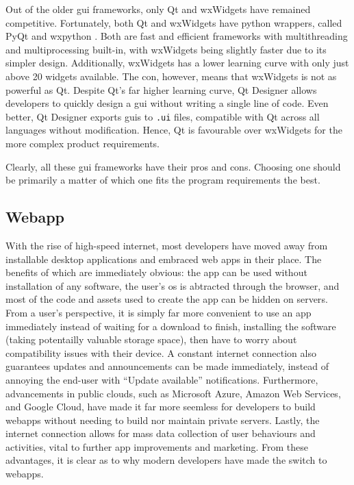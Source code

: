 \documentclass[11pt]{article}
\begin{document}
Out of the older \acrshort{gui} \glspl{framework}, only Qt and wxWidgets have remained competitive. Fortunately, both Qt and wxWidgets have \Gls{python} wrappers, called PyQt and wx\Gls{python} \cite{pyqt} \cite{wxpython}. Both are fast and efficient \glspl{framework} with multithreading and multiprocessing built-in, with wxWidgets being slightly faster due to its simpler design. Additionally, wxWidgets has a lower learning curve with only just above 20 widgets available. The con, however, means that wxWidgets is not as powerful as Qt. Despite Qt's far higher learning curve, Qt Designer allows developers to quickly design a \acrshort{gui} without writing a single line of code. Even better, Qt Designer exports \acrshort{gui}s to \texttt{.ui} files, compatible with Qt across all languages without modification. Hence, Qt is favourable over wxWidgets for the more complex product requirements.

Clearly, all these \acrshort{gui} \glspl{framework} have their pros and cons. Choosing one should be primarily a matter of which one fits the program requirements the best.

\subsection{Webapp}

With the rise of high-speed internet, most developers have moved away from installable desktop applications and embraced web apps in their place. The benefits of which are immediately obvious: the app can be used without installation of any software, the \gls{user}'s \acrshort{os} is abtracted through the \gls{browser}, and most of the code and assets used to create the app can be hidden on \gls{server}s. From a \gls{user}'s perspective, it is simply far more convenient to use an app immediately instead of waiting for a download to finish, installing the software (taking potentailly valuable storage space), then have to worry about compatibility issues with their device. A constant internet connection also guarantees updates and announcements can be made immediately, instead of annoying the end-user with ``Update available'' notifications. Furthermore, advancements in public clouds, such as Microsoft Azure, Amazon Web Services, and Google Cloud, have made it far more seemless for developers to build \gls{webapp}s without needing to build nor maintain private \gls{server}s. Lastly, the internet connection allows for mass data collection of user behaviours and activities, vital to further app improvements and marketing. From these advantages, it is clear as to why modern developers have made the switch to \gls{webapp}s.
\end{document}
